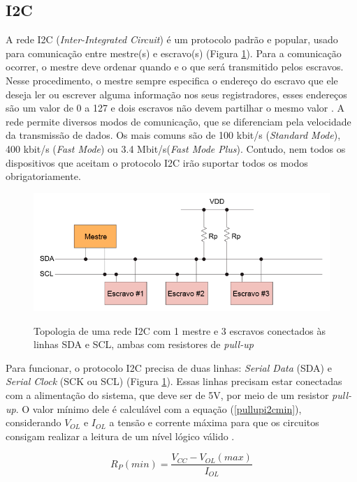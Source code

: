 \subsection{I2C}

\label{sec:i2c}
A rede I2C (\textit{Inter-Integrated Circuit}) é um protocolo padrão e popular, usado para comunicação entre mestre(s) e escravo(s) (Figura \ref{fig:i2connection}). 
Para a comunicação ocorrer, o mestre deve ordenar quando e o que será transmitido pelos escravos. Nesse procedimento, o mestre sempre especifica o endereço do escravo que ele deseja ler ou escrever alguma informação nos seus registradores, esses endereços são um valor de 0 a 127 e dois escravos não devem partilhar o mesmo valor \cite{man:texasI2C}. A rede permite diversos modos de comunicação, que se diferenciam pela velocidade da transmissão de dados. Os mais comuns são de 100 kbit/s (\textit{Standard Mode}), 400 kbit/s (\textit{Fast Mode}) ou 3.4 Mbit/s(\textit{Fast Mode Plus}). Contudo, nem todos os dispositivos que aceitam o protocolo I2C irão suportar todos os modos obrigatoriamente.

\begin{figure}[!htb]
	\centering
	\caption{Topologia de uma rede I2C com 1 mestre e 3 escravos conectados às linhas SDA e SCL, ambas com resistores de \textit{pull-up}}
	\includegraphics[width=0.7\linewidth]{figuras/revisaobiblio/i2connection}
	\label{fig:i2connection}
\end{figure}

Para funcionar, o protocolo I2C precisa de duas linhas: \textit{Serial Data} (SDA) e \textit{Serial Clock} (SCK ou SCL) (Figura \ref{fig:i2connection}). Essas linhas precisam estar conectadas com a alimentação do sistema, que deve ser de 5V, por meio de um resistor \textit{pull-up}. O valor mínimo dele é calculável com a equação (\ref{pullupi2cmin}), considerando $ V_{OL} $ e $ I_{OL} $ a tensão e corrente máxima para que os circuitos consigam realizar a leitura de um nível lógico válido \cite{man:texasI2Cpullup}. 

\begin{equation}
	R_P(min) = \dfrac{ V_{CC} - V_{OL}(max) }{I_{OL}}
	\label{pullupi2cmin}
\end{equation}

